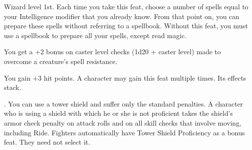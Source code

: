 {Wizard level 1st.}
{Each time you take this feat, choose a number of spells equal to your Intelligence modifier that you already know. From that point on, you can prepare these spells without referring to a spellbook.}
{Without this feat, you must use a spellbook to prepare all your spells, except read magic.}{}

{You get a +2 bonus on caster level checks (1d20 + caster level) made to overcome a creature's spell resistance.}

{You gain +3 hit points.}{}
{A character may gain this feat multiple times. Its effects stack.}

{.}
{You can use a tower shield and suffer only the standard penalties.}
{A character who is using a shield with which he or she is not proficient takes the shield's armor check penalty on attack rolls and on all skill checks that involve moving, including Ride.}
{Fighters automatically have Tower Shield Proficiency as a bonus feat. They need not select it.}

